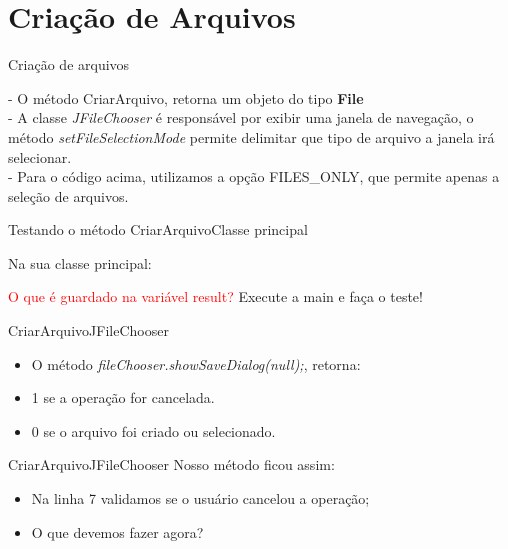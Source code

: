 \documentclass[11pt,aspectratio=43,ignorenonframetext,t]{beamer}
\begin{document}
\section{Criação de Arquivos}
\begin{frame}{Criação de arquivos}


\vspace{0.3cm}
- O método CriarArquivo, retorna um objeto do tipo \textbf{File}\\ 
\pause
- A classe \textit{JFileChooser} é responsável por exibir uma janela de 
navegação, o método \textit{setFileSelectionMode} permite delimitar que tipo de 
arquivo a janela irá selecionar. \\
\pause
- Para o código acima, utilizamos a opção 
\textcolor{green!99}{FILES\_ONLY}, que permite apenas a seleção de arquivos.\\

\end{frame}
\begin{frame}{Testando o método CriarArquivo}{Classe principal}

Na sua classe principal:

\pause 
\textcolor{red}{O que é guardado na variável result?} Execute a main e faça o 
teste!

\end{frame}
\begin{frame}{CriarArquivo}{JFileChooser}
  
    
\vspace{0.5cm}
\pause
  \begin{itemize}
    \item O método \textit{fileChooser.showSaveDialog(null);}, retorna:
    \item 1 se a operação for cancelada.
    \item 0 se o arquivo foi criado ou selecionado.
  \end{itemize}
 
\end{frame}
\begin{frame}{CriarArquivo}{JFileChooser}
  Nosso método ficou assim:


\pause
  \begin{itemize}
    \item Na linha 7 validamos se o usuário cancelou a operação;
    \pause \item O que devemos fazer agora?
  \end{itemize}
\end{frame}
\end{document}
